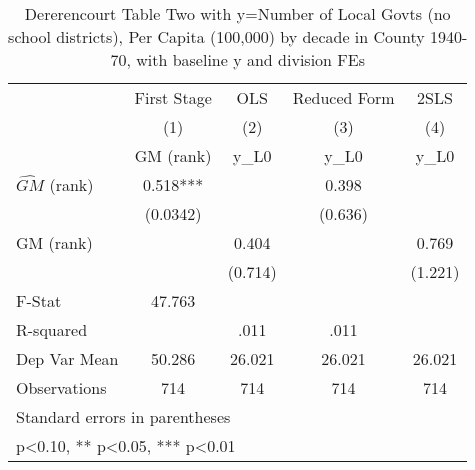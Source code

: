 \begin{table}[htbp]\centering
\def\sym#1{\ifmmode^{#1}\else\(^{#1}\)\fi}
\caption{Dererencourt Table Two with y=Number of Local Govts (no school districts), Per Capita (100,000) by decade in County 1940-70, with baseline y and division FEs}
\begin{tabular}{l*{4}{c}}
\toprule
                    & First Stage   &         OLS   &Reduced Form   &        2SLS   \\
                    &\multicolumn{1}{c}{(1)}&\multicolumn{1}{c}{(2)}&\multicolumn{1}{c}{(3)}&\multicolumn{1}{c}{(4)}\\
                    &\multicolumn{1}{c}{GM  (rank)}&\multicolumn{1}{c}{y\_L0}&\multicolumn{1}{c}{y\_L0}&\multicolumn{1}{c}{y\_L0}\\
\midrule
$\hat{GM}$ (rank)   &       0.518***&               &       0.398   &               \\
                    &    (0.0342)   &               &     (0.636)   &               \\
\addlinespace
GM  (rank)          &               &       0.404   &               &       0.769   \\
                    &               &     (0.714)   &               &     (1.221)   \\
\midrule
F-Stat              &      47.763   &               &               &               \\
R-squared           &               &        .011   &        .011   &               \\
Dep Var Mean        &      50.286   &      26.021   &      26.021   &      26.021   \\
Observations        &         714   &         714   &         714   &         714   \\
\bottomrule
\multicolumn{5}{l}{\footnotesize Standard errors in parentheses}\\
\multicolumn{5}{l}{\footnotesize * p<0.10, ** p<0.05, *** p<0.01}\\
\end{tabular}
\end{table}
